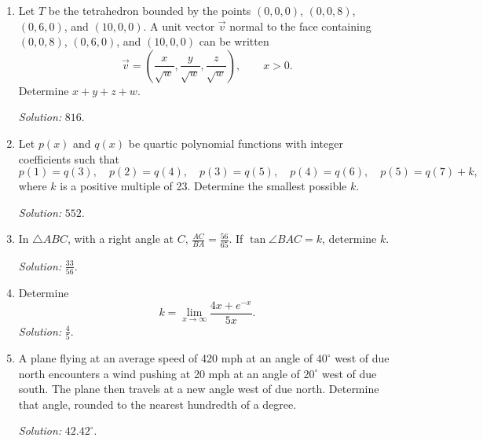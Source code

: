 \documentclass[11pt]{article}
\begin{document}
\begin{enumerate}[label=\textbf{\arabic*.}]
\item Let $T$ be the tetrahedron bounded by the points $(0,0,0)$, $(0,0,8)$, $(0,6,0)$, and $(10,0,0)$. A unit vector $\vec{v}$ normal to the face containing $(0,0,8)$, $(0,6,0)$, and $(10,0,0)$ can be written
\[
\vec{v}=\left(\frac{x}{\sqrt{w}},\frac{y}{\sqrt{w}},\frac{z}{\sqrt{w}}\right),\qquad x>0.
\]
Determine $x+y+z+w$.\par\textit{Solution: }$816$.

\item Let $p(x)$ and $q(x)$ be quartic polynomial functions with integer coefficients such that
\[
p(1)=q(3),\quad p(2)=q(4),\quad p(3)=q(5),\quad p(4)=q(6),\quad p(5)=q(7)+k,
\]
where $k$ is a positive multiple of 23. Determine the smallest possible $k$.\par\textit{Solution: }$552$.

\item In $\triangle ABC$, with a right angle at $C$, $\frac{AC}{BA}=\frac{56}{65}$. If $\tan\angle BAC=k$, determine $k$.\par\textit{Solution: }$\frac{33}{56}$.

\item Determine
\[
k=\lim_{x\to\infty}\frac{4x+e^{-x}}{5x}.
\]
\textit{Solution: }$\frac45$.

\item A plane flying at an average speed of 420 mph at an angle of $40^\circ$ west of due north encounters a wind pushing at 20 mph at an angle of $20^\circ$ west of due south. The plane then travels at a new angle west of due north. Determine that angle, rounded to the nearest hundredth of a degree.\par\textit{Solution: }$42.42^\circ$.
\end{enumerate}
\end{document}
